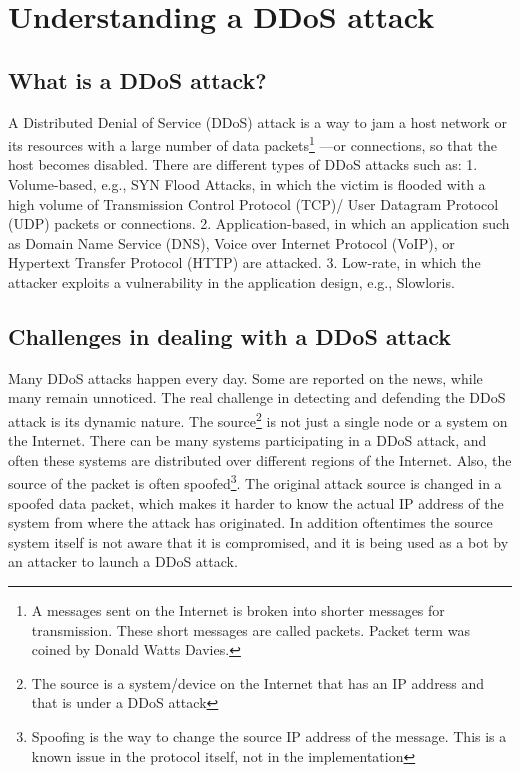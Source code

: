\documentclass[12pt,oneside,a4paper]{article}
\begin{document}

\doublespacing
\renewcommand{\thepage}{\roman{page}}%
\setcounter{page}{2}%

\tableofcontents
\newpage
\pagestyle{myheadings}

\pagebreak
\renewcommand{\thepage}{\arabic{page}}%

\section{Understanding a DDoS attack}

\subsection{What is a DDoS attack?}
A Distributed Denial of Service (DDoS) attack is a way to jam a host network or its resources with a large number of data packets\footnote{A messages sent on the Internet is broken into shorter messages for transmission. These short messages are called packets. Packet term was coined by Donald Watts Davies.} \cite{network-data-packet} ---or connections, so that the host becomes disabled. There are different types of DDoS attacks such as:
1. Volume-based, e.g., SYN Flood Attacks, in which the victim is flooded with a high volume of  Transmission Control Protocol (TCP)/ User Datagram Protocol (UDP) packets or connections.
2. Application-based, in which an application such as Domain Name Service (DNS), Voice over Internet Protocol (VoIP), or Hypertext Transfer Protocol (HTTP) are attacked.
3. Low-rate, in which the attacker exploits a vulnerability in the application design, e.g., Slowloris.
\cite{DDoS-attacks}

\subsection{Challenges in dealing with a DDoS attack}
Many DDoS attacks happen every day\cite{ddos-attack-news}. Some are reported on the news, while many remain unnoticed. The real challenge in detecting and defending the DDoS attack is its dynamic nature. The source\footnote{The source is a system/device on the Internet that has an IP address and that is under a DDoS attack} is not just a single node or a system on the Internet. There can be many systems participating in a DDoS attack, and often these systems are distributed over different regions of the Internet. Also, the source of the packet is often spoofed\footnote{Spoofing is the way to change the source IP address of the message. This is a known issue in the protocol itself, not in the implementation}\cite{ip-spoofing}. The original attack source is changed in a spoofed data packet, which makes it harder to know the actual IP address of the system from where the attack has originated. In addition oftentimes the source system itself is not aware that it is compromised, and it is being used as a bot\cite{bot} by an attacker to launch a DDoS attack.
\end{document}
